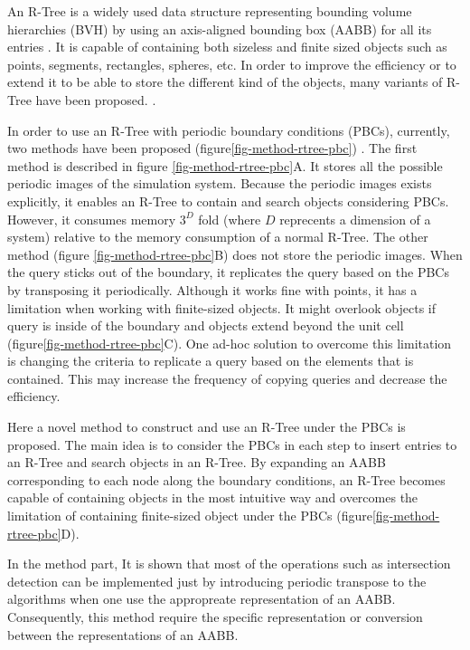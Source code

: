 \documentclass[10pt,letterpaper,twocolumn]{article}
\begin{document}
An R-Tree is a widely used data structure representing bounding volume
hierarchies (BVH) by using an axis-aligned bounding box (AABB) for all its
entries \cite{Guttman1984}.
It is capable of containing both sizeless and finite sized objects such as
points, segments, rectangles, spheres, etc.
In order to improve the efficiency or to extend it to be able to store the
different kind of the objects, many variants of R-Tree have been proposed.
\cite{Beckmann1990, Leuteneggert1997, Berchtold2001, CoSTR-R-tree2016}.

In order to use an R-Tree with periodic boundary conditions (PBCs), currently,
two methods have been proposed (figure\ref{fig-method-rtree-pbc})
\cite{CoSTR-R-tree2016}.
The first method is described in figure \ref{fig-method-rtree-pbc}A.
It stores all the possible periodic images of the simulation system.
Because the periodic images exists explicitly, it enables an R-Tree to
contain and search objects considering PBCs.
However, it consumes memory $3^D$ fold (where $D$ reprecents a dimension of a
system) relative to the memory consumption of a normal R-Tree.
The other method (figure \ref{fig-method-rtree-pbc}B) does not store the
periodic images.
When the query sticks out of the boundary, it replicates the query based on the
PBCs by transposing it periodically.
Although it works fine with points, it has a limitation when working with
finite-sized objects. It might overlook objects if query is inside of
the boundary and objects extend beyond the unit cell
(figure\ref{fig-method-rtree-pbc}C).
One ad-hoc solution to overcome this limitation is changing the criteria to
replicate a query based on the elements that is contained.
This may increase the frequency of copying queries and decrease the efficiency.

Here a novel method to construct and use an R-Tree under the PBCs is proposed.
The main idea is to consider the PBCs in each step to insert entries to an
R-Tree and search objects in an R-Tree.
By expanding an AABB corresponding to each node along the boundary conditions,
an R-Tree becomes capable of containing objects in the most intuitive way and
overcomes the limitation of containing finite-sized object under the PBCs
(figure\ref{fig-method-rtree-pbc}D).

In the method part, It is shown that most of the operations such as intersection
detection can be implemented just by introducing periodic transpose to the
algorithms when one use the appropreate representation of an AABB.
Consequently, this method require the specific representation or
conversion between the representations of an AABB.
\end{document}
